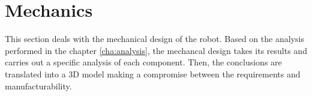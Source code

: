\section{Mechanics} %
\label{sec:mechanics}
This section deals with the mechanical design of the robot.
Based on the analysis performed in the chapter \ref{cha:analysis}, the mechancal design takes its results and carries out a specific analysis of each component.
Then, the conclusions are translated into a 3D model making a compromise between the requirements and manufacturability.












